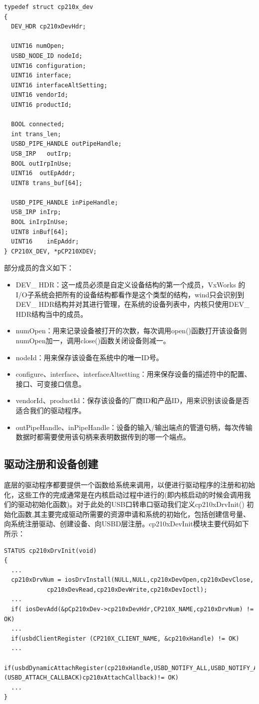 \lstset{language=C}
\begin{lstlisting}
typedef struct cp210x_dev
{
  DEV_HDR cp210xDevHdr; 
  
  UINT16 numOpen;
  USBD_NODE_ID nodeId;
  UINT16 configuration;	
  UINT16 interface; 
  UINT16 interfaceAltSetting;
  UINT16 vendorId;
  UINT16 productId;

  BOOL connected;  
  int trans_len;
  USBD_PIPE_HANDLE outPipeHandle; 
  USB_IRP	outIrp; 
  BOOL outIrpInUse; 
  UINT16  outEpAddr;
  UINT8 trans_buf[64];

  USBD_PIPE_HANDLE inPipeHandle;
  USB_IRP inIrp;
  BOOL inIrpInUse;
  UINT8 inBuf[64];
  UINT16 	inEpAddr;
} CP210X_DEV, *pCP210XDEV;
\end{lstlisting}
\noindent 部分成员的含义如下：

\begin{itemize}
\item DEV\_ HDR：这一成员必须是自定义设备结构的第一个成员，VxWorks 的I/O子系统会把所有的设备结构都看作是这个类型的结构，wind只会识别到DEV\_ HDR结构并对其进行管理，在系统的设备列表中，内核只使用DEV\_ HDR结构当中的成员。
\item numOpen：用来记录设备被打开的次数，每次调用open()函数打开该设备则numOpen加一，调用close()函数关闭设备则减一。
\item nodeId：用来保存该设备在系统中的唯一ID号。
\item configure、interface、interfaceAltsetting：用来保存设备的描述符中的配置、接口、可变接口信息。
\item vendorId、productId：保存该设备的厂商ID和产品ID，用来识别该设备是否适合我们的驱动程序。
\item outPipeHandle、inPipeHandle：设备的输入/输出端点的管道句柄，每次传输数据时都需要使用该句柄来表明数据传到的哪一个端点。
\end{itemize}






\subsection{驱动注册和设备创建} 
	
	底层的驱动程序都要提供一个函数给系统来调用，以便进行驱动程序的注册和初始化，这些工作的完成通常是在内核启动过程中进行的(即内核启动的时候会调用我们的驱动初始化函数)。对于此处的USB口转串口驱动我们定义cp210xDrvInit() 初始化函数,其主要完成驱动所需要的资源申请和系统的初始化，包括创建信号量、向系统注册驱动、创建设备、向USBD层注册。cp210xDevInit模块主要代码如下所示：
\lstset{language=C}
\begin{lstlisting}
STATUS cp210xDrvInit(void)
{
  ... 	
  cp210xDrvNum = iosDrvInstall(NULL,NULL,cp210xDevOpen,cp210xDevClose,
			cp210xDevRead,cp210xDevWrite,cp210xDevIoctl);
  ...
  if( iosDevAdd(&pCp210xDev->cp210xDevHdr,CP210X_NAME,cp210xDrvNum) != OK)
  ...  
  if(usbdClientRegister (CP210X_CLIENT_NAME, &cp210xHandle) != OK)
  ...  
  if(usbdDynamicAttachRegister(cp210xHandle,USBD_NOTIFY_ALL,USBD_NOTIFY_ALL,USBD_NOTIFY_ALL,TRUE,(USBD_ATTACH_CALLBACK)cp210xAttachCallback)!= OK)
  ...
}
\end{lstlisting}\\


